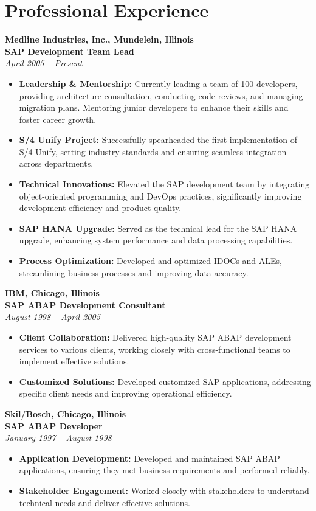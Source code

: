 \documentclass[a4paper,10pt]{article}
\begin{document}
\section*{Professional Experience}
\textbf{Medline Industries, Inc., Mundelein, Illinois} \\
\textbf{SAP Development Team Lead} \\
\textit{April 2005 – Present}
\begin{itemize}[leftmargin=*]
    \item \textbf{Leadership \& Mentorship:} Currently leading a team of 100 developers, providing architecture consultation, conducting code reviews, and managing migration plans. Mentoring junior developers to enhance their skills and foster career growth.
    \item \textbf{S/4 Unify Project:} Successfully spearheaded the first implementation of S/4 Unify, setting industry standards and ensuring seamless integration across departments.
    \item \textbf{Technical Innovations:} Elevated the SAP development team by integrating object-oriented programming and DevOps practices, significantly improving development efficiency and product quality.
    \item \textbf{SAP HANA Upgrade:} Served as the technical lead for the SAP HANA upgrade, enhancing system performance and data processing capabilities.
    \item \textbf{Process Optimization:} Developed and optimized IDOCs and ALEs, streamlining business processes and improving data accuracy.
\end{itemize}

\textbf{IBM, Chicago, Illinois} \\
\textbf{SAP ABAP Development Consultant} \\
\textit{August 1998 – April 2005}
\begin{itemize}[leftmargin=*]
    \item \textbf{Client Collaboration:} Delivered high-quality SAP ABAP development services to various clients, working closely with cross-functional teams to implement effective solutions.
    \item \textbf{Customized Solutions:} Developed customized SAP applications, addressing specific client needs and improving operational efficiency.
\end{itemize}

\textbf{Skil/Bosch, Chicago, Illinois} \\
\textbf{SAP ABAP Developer} \\
\textit{January 1997 – August 1998}
\begin{itemize}[leftmargin=*]
    \item \textbf{Application Development:} Developed and maintained SAP ABAP applications, ensuring they met business requirements and performed reliably.
    \item \textbf{Stakeholder Engagement:} Worked closely with stakeholders to understand technical needs and deliver effective solutions.
\end{itemize}
\end{document}
